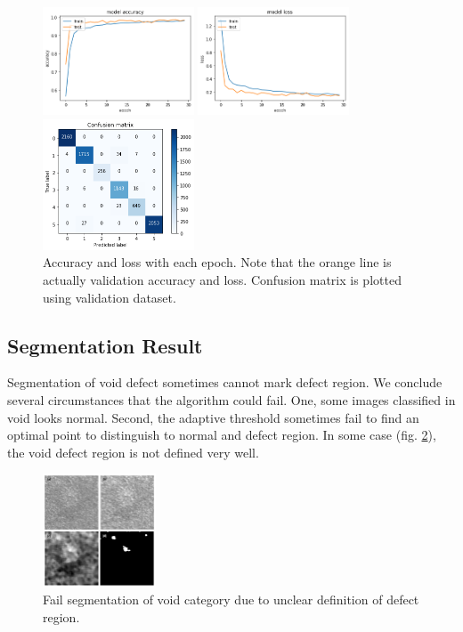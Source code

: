 \documentclass[conference]{IEEEtran}
\begin{document}
\begin{CJK}{UTF8}{bsmi}
\begin{figure}[!htbp]
\centerline{\includegraphics[width=0.4\textwidth]{../figures/accuracy.png}}
\centerline{\includegraphics[width=0.4\textwidth]{../figures/loss.png}}
\centerline{\includegraphics[width=0.4\textwidth]{../figures/confusion_matrix.png}}
\caption{Accuracy and loss with each epoch. Note that the orange line is actually validation accuracy and loss. Confusion matrix is plotted using validation dataset.}
\label{fig:Epoch}
\end{figure}

\subsection{Segmentation Result}
Segmentation of void defect sometimes cannot mark defect region. We conclude several circumstances that the algorithm could fail. One, some images classified in void looks normal. Second, the adaptive threshold sometimes fail to find an optimal point to distinguish to normal and defect region. In some case (fig. \ref{fig:Void2}), the void defect region is not defined very well.

\begin{figure}[!htbp]
\centerline{\includegraphics[width=0.3\textwidth]{../figures/Void2.png}}
\caption{Fail segmentation of void category due to unclear definition of defect region.}
\label{fig:Void2}
\end{figure}


\end{CJK}
\end{document}
